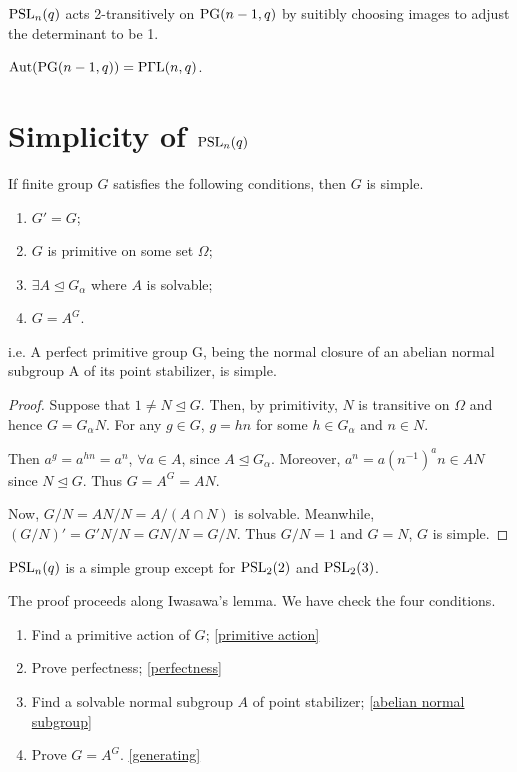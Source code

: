 \documentclass[a4paper,11pt]{article}
\def\subtitle#1{\section{#1}}
\begin{document}
\begin{corollary}\label{primitive action}
    $\mathrm{PSL}_n(q)$ acts 2-transitively on $\mathrm{PG}(n-1,q)$ by suitibly choosing images to adjust the determinant to be 1.
\end{corollary}

\begin{theorem}
    $\mathrm{Aut}(\mathrm{PG}(n-1,q))=\mathrm{P\Gamma L}(n,q)$. 
\end{theorem}



\subtitle{Simplicity of $\mathrm{PSL}_n(q)$}


\begin{lemma}[Iwasawa]
    If finite group $G$ satisfies the following conditions, then $G$ is simple.
    \begin{enumerate}[itemsep=0pt,label=\roman*.]
        \item $G'=G$;
        \item $G$ is primitive on some set $\Omega$;
        \item $\exists A\trianglelefteq G_\alpha$ where $A$ is solvable;
        \item $G=A^G$.
    \end{enumerate}
    i.e. A perfect primitive group G, being the normal
    closure of an abelian normal subgroup A of its point stabilizer, is simple.
\end{lemma}
\begin{proof}
    Suppose that $1\neq N\trianglelefteq G$. Then, by primitivity, $N$ is transitive on $\Omega$ and hence $G=G_\alpha N$. For any $g\in G$, $g=hn$ for some $h\in G_\alpha$ and $n\in N$. 
    
    Then $a^g=a^{hn}=a^n$, $\forall a\in A$, since $A\trianglelefteq G_\alpha$. Moreover, $a^n=a(n^{-1})^{a}n\in AN$ since $N\trianglelefteq G$. Thus $G=A^G= AN$.
    
    Now, $G/N=AN/N=A/(A\cap N)$ is solvable. Meanwhile, $(G/N)'=G'N/N=GN/N=G/N$. Thus $G/N=1$ and $G=N$, $G$ is simple.
\end{proof}

\begin{theorem}
    $\mathrm{PSL}_n(q)$ is a simple group except for $\mathrm{PSL}_2(2)$ and $\mathrm{PSL}_2(3)$.
\end{theorem}

The proof proceeds along Iwasawa's lemma. We have check the four conditions.
\begin{enumerate}[itemsep=0pt,label=\roman*.]
    \item Find a primitive action of $G$; \ref{primitive action}
    \item Prove perfectness; \ref{perfectness}
    \item Find a solvable normal subgroup $A$ of point stabilizer; \ref{abelian normal subgroup}
    \item Prove $G=A^G$. \ref{generating}
\end{enumerate}
\end{document}
